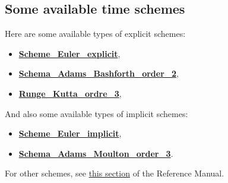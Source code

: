 \subsection{Some available time schemes}
Here are some available types of explicit schemes:
\begin{itemize}
\item \href{\REFERENCEMANUAL\#eulerscheme}{\textbf{Scheme\_Euler\_explicit}},
\item \href{\REFERENCEMANUAL\#schemaadamsbashforthorder2}{\textbf{Schema\_Adams\_Bashforth\_order\_2}},
\item \href{\REFERENCEMANUAL\#rungekuttaordre3}{\textbf{Runge\_Kutta\_ordre\_3}},
\end{itemize}

And also some available types of implicit schemes:
\begin{itemize}
\item \href{\REFERENCEMANUAL\#schemaeulerimplicite}{\textbf{Scheme\_Euler\_implicit}},
\item \href{\REFERENCEMANUAL\#schemaadamsmoultonorder3}{\textbf{Schema\_Adams\_Moulton\_order\_3}}.
\end{itemize}

For other schemes, see \href{\REFERENCEMANUAL\#schematempsbase}{this section} of the Reference Manual.\\

